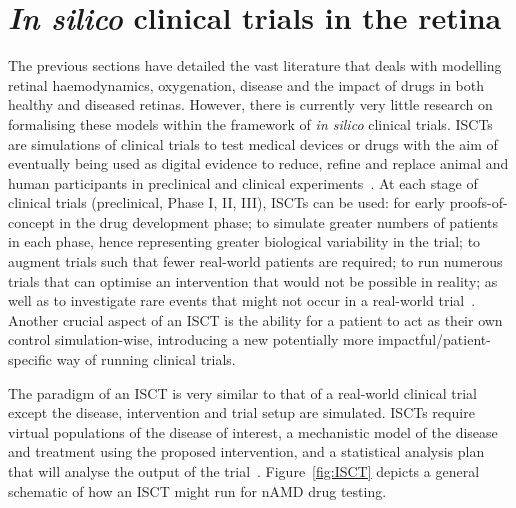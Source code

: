 \documentclass{article}
\begin{document}
\section{\textit{In silico} clinical trials in the retina}\label{sec:InSilicoTrials}

The previous sections have detailed the vast literature that deals with modelling retinal haemodynamics, oxygenation, disease and the impact of drugs in both healthy and diseased retinas. 
However, there is currently very little research on formalising these models within the framework of \textit{in silico} clinical trials. 
ISCTs are simulations of clinical trials to test medical devices or drugs with the aim of eventually being used as digital evidence to reduce, refine and replace animal and human participants in preclinical and clinical experiments~\cite{Viceconti2021a}. 
At each stage of clinical trials (preclinical, Phase I, II, III), ISCTs can be used: for early proofs-of-concept in the drug development phase; to simulate greater numbers of patients in each phase, hence representing greater biological variability in the trial; to augment trials such that fewer real-world patients are required; to run numerous trials that can optimise an intervention that would not be possible in reality; as well as to investigate rare events that might not occur in a real-world trial~\cite{Pappalardo2019, Viceconti_2016, Viceconti2017}. 
Another crucial aspect of an ISCT is the ability for a patient to act as their own control simulation-wise, introducing a new potentially more impactful/patient-specific way of running clinical trials.

The paradigm of an ISCT is very similar to that of a real-world clinical trial except the disease, intervention and trial setup are simulated. 
ISCTs require virtual populations of the disease of interest, a mechanistic model of the disease and treatment using the proposed intervention, and a statistical analysis plan that will analyse the output of the trial~\cite{Alfonso2020}. 
Figure~\ref{fig:ISCT} depicts a general schematic of how an ISCT might run for nAMD drug testing.
\end{document}
